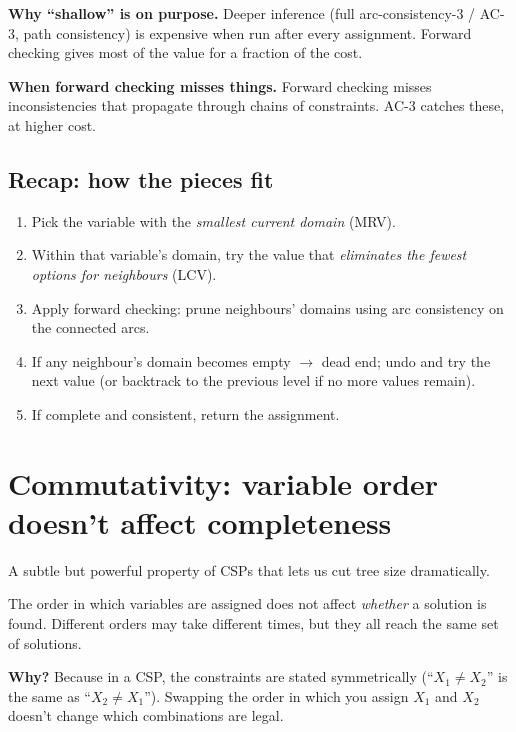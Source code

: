 \documentclass[11pt, a4paper]{article}
\begin{document}
\textbf{Why ``shallow'' is on purpose.} Deeper inference (full arc-consistency-3 / AC-3, path consistency) is expensive when run after every assignment. Forward checking gives most of the value for a fraction of the cost.

\textbf{When forward checking misses things.} Forward checking misses inconsistencies that propagate through chains of constraints. AC-3 catches these, at higher cost.

\subsection{Recap: how the pieces fit}

\begin{exbox}
\begin{enumerate}
  \item Pick the variable with the \emph{smallest current domain} (MRV).
  \item Within that variable's domain, try the value that \emph{eliminates the fewest options for neighbours} (LCV).
  \item Apply forward checking: prune neighbours' domains using arc consistency on the connected arcs.
  \item If any neighbour's domain becomes empty $\to$ dead end; undo and try the next value (or backtrack to the previous level if no more values remain).
  \item If complete and consistent, return the assignment.
\end{enumerate}
\end{exbox}

\section{Commutativity: variable order doesn't affect completeness}

A subtle but powerful property of CSPs that lets us cut tree size dramatically.

\begin{defbox}
The order in which variables are assigned does not affect \emph{whether} a solution is found. Different orders may take different times, but they all reach the same set of solutions.
\end{defbox}

\textbf{Why?} Because in a CSP, the constraints are stated symmetrically (``$X_1 \neq X_2$'' is the same as ``$X_2 \neq X_1$''). Swapping the order in which you assign $X_1$ and $X_2$ doesn't change which combinations are legal.
\end{document}

